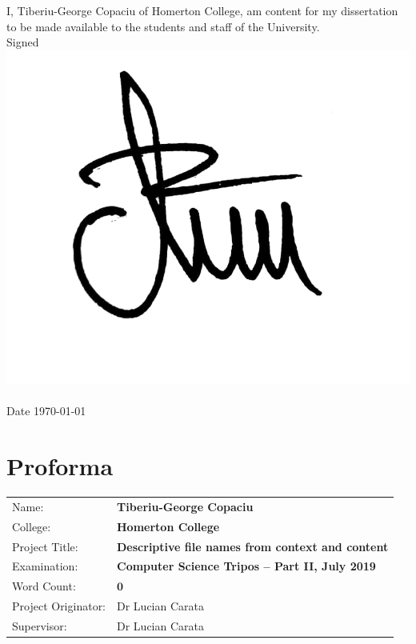 \documentclass[12pt,a4paper,oneside]{report}
\begin{document}
\noindent
I, Tiberiu-George Copaciu of Homerton College,
am content for my dissertation to be made available to the students and staff of the University. \\

\noindent
Signed
\includegraphics[height=1.5\baselineskip]{Images/signature.jpg}
\\ \\
Date \today

\newpage

\chapter*{Proforma}

{\large
  \begin{tabular}{ll}
    Name:               & \bf Tiberiu-George Copaciu                          \\
    College:            & \bf Homerton College                                \\
    Project Title:      & \bf Descriptive file names from context and content \\
    Examination:        & \bf Computer Science Tripos -- Part II, July 2019   \\
    Word Count:         & \bf $\mathbf{0}$\footnotemark[1]                    \\
    Project Originator: & Dr Lucian Carata                                    \\
    Supervisor:         & Dr Lucian Carata                                    \\
  \end{tabular}
}
\end{document}
